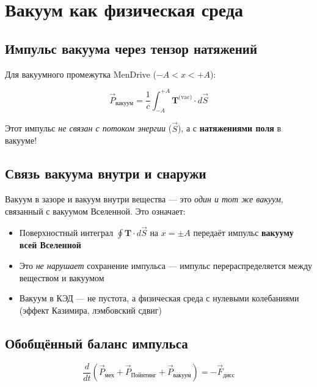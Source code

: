 \documentclass[a4paper,12pt]{article}
\begin{document}
\section{Вакуум как физическая среда}

\subsection{Импульс вакуума через тензор натяжений}

Для вакуумного промежутка MenDrive ($-A < x < +A$):

\begin{equation}
\boxed{
\vec{P}_{\text{вакуум}} = \frac{1}{c}\int_{-A}^{+A} \mathbf{T}^{\text{(vac)}}\cdot d\vec{S}
}
\label{eq:vacuum_momentum}
\end{equation}

Этот импульс \textit{не связан с потоком энергии} ($\vec{S}$), а с
\textbf{натяжениями поля} в вакууме!

\subsection{Связь вакуума внутри и снаружи}

Вакуум в зазоре и вакуум внутри вещества --- это \textit{один и тот же вакуум},
связанный с вакуумом Вселенной. Это означает:
\begin{itemize}
    \item Поверхностный интеграл $\oint\mathbf{T}\cdot d\vec{S}$ на $x = \pm A$
    передаёт импульс \textbf{вакууму всей Вселенной}
    \item Это \textit{не нарушает} сохранение импульса --- импульс
    перераспределяется между веществом и вакуумом
    \item Вакуум в КЭД --- не пустота, а физическая среда с нулевыми
    колебаниями (эффект Казимира, лэмбовский сдвиг)
\end{itemize}

\subsection{Обобщённый баланс импульса}

\begin{equation}
\boxed{
\frac{d}{dt}\left(\vec{P}_{\text{мех}} + \vec{P}_{\text{Пойнтинг}} +
\vec{P}_{\text{вакуум}}\right) = -\vec{F}_{\text{дисс}}
}
\label{eq:generalized_momentum}
\end{equation}
\end{document}
